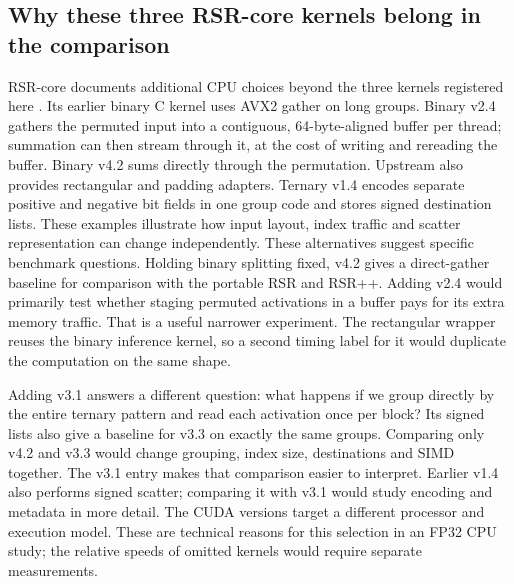 \documentclass[11pt,a4paper]{article}
\newcommand{\familymark}[1]{\markboth{#1}{}}
\begin{document}
\subsection{Why these three RSR-core kernels belong in the comparison}
RSR-core documents additional CPU choices beyond the three kernels registered
here \cite{guide}. Its earlier binary C kernel uses AVX2 gather on long groups.
Binary v2.4 gathers the permuted input into a contiguous, 64-byte-aligned
buffer per thread; summation can then stream through it, at the cost of
writing and rereading the buffer. Binary v4.2 sums directly through
the permutation. Upstream also provides rectangular and padding adapters.
Ternary v1.4 encodes separate positive and negative bit fields in one group
code and stores signed destination lists. These examples illustrate how
input layout, index traffic and scatter representation can change independently.
These alternatives suggest specific benchmark questions. Holding binary splitting
fixed, v4.2 gives a direct-gather baseline for comparison with the portable RSR
and RSR++. Adding v2.4 would primarily test whether staging permuted activations
in a buffer pays for its extra memory traffic. That is a useful narrower
experiment. The rectangular wrapper reuses the binary inference kernel, so a
second timing label for it would duplicate the computation on the same shape.

Adding v3.1 answers a different question: what happens if we group directly by
the entire ternary pattern and read each activation once per block? Its signed lists also give a
baseline for v3.3 on exactly the same groups. Comparing only v4.2 and v3.3
would change grouping, index size, destinations and SIMD together. The v3.1
entry makes that comparison easier to interpret. Earlier v1.4 also performs
signed scatter; comparing it with v3.1 would study encoding and metadata in
more detail. The CUDA versions target a different processor and execution
model. These are technical reasons for this selection in an FP32 CPU study;
the relative speeds of omitted kernels would require separate measurements.

\familymark{Sparse Segment Reduction}
\end{document}
